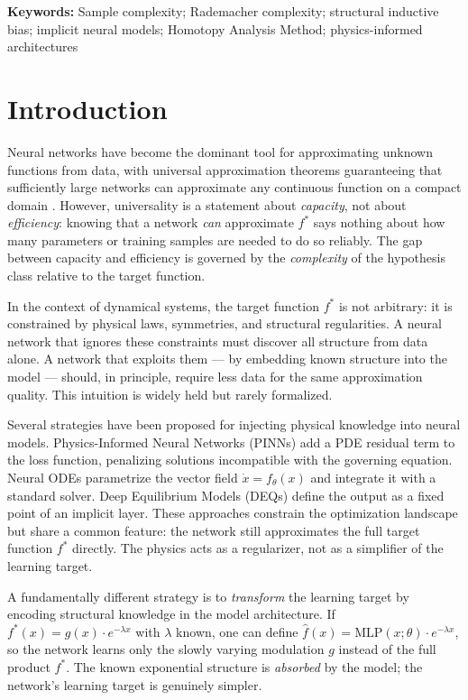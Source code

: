 \documentclass[12pt]{article}
\newcommand{\MLP}{\mathrm{MLP}}
\begin{document}
\noindent\textbf{Keywords:} Sample complexity; Rademacher complexity;
structural inductive bias; implicit neural models;
Homotopy Analysis Method; physics-informed architectures

\linenumbers

\section{Introduction}
\label{sec:intro}

Neural networks have become the dominant tool for approximating
unknown functions from data, with universal approximation theorems
guaranteeing that sufficiently large networks can approximate any
continuous function on a compact domain
\cite{Cybenko1989, Hornik1991, Funahashi1989}.
However, universality is a statement about \emph{capacity}, not about
\emph{efficiency}: knowing that a network \emph{can} approximate
$f^*$ says nothing about how many parameters or training samples are
needed to do so reliably.
The gap between capacity and efficiency is governed by the
\emph{complexity} of the hypothesis class relative to the target
function.

In the context of dynamical systems, the target function $f^*$ is
not arbitrary: it is constrained by physical laws, symmetries, and
structural regularities.
A neural network that ignores these constraints must discover all
structure from data alone.
A network that exploits them --- by embedding known structure into
the model --- should, in principle, require less data for the same
approximation quality.
This intuition is widely held but rarely formalized.

Several strategies have been proposed for injecting physical
knowledge into neural models.
Physics-Informed Neural Networks (PINNs) \cite{Raissi2019} add a
PDE residual term to the loss function, penalizing solutions
incompatible with the governing equation.
Neural ODEs \cite{Chen2018} parametrize the vector field
$\dot{x} = f_\theta(x)$ and integrate it with a standard solver.
Deep Equilibrium Models (DEQs) \cite{Bai2019} define the output as
a fixed point of an implicit layer.
These approaches constrain the optimization landscape but share a
common feature: the network still approximates the full target
function $f^*$ directly.
The physics acts as a regularizer, not as a simplifier of the
learning target.

A fundamentally different strategy is to \emph{transform} the
learning target by encoding structural knowledge in the model
architecture.
If $f^*(x) = g(x) \cdot e^{-\lambda x}$ with $\lambda$ known, one
can define $\hat{f}(x) = \MLP(x;\theta) \cdot e^{-\lambda x}$, so
the network learns only the slowly varying modulation $g$ instead of
the full product $f^*$.
The known exponential structure is \emph{absorbed} by the model; the
network's learning target is genuinely simpler.
\end{document}
